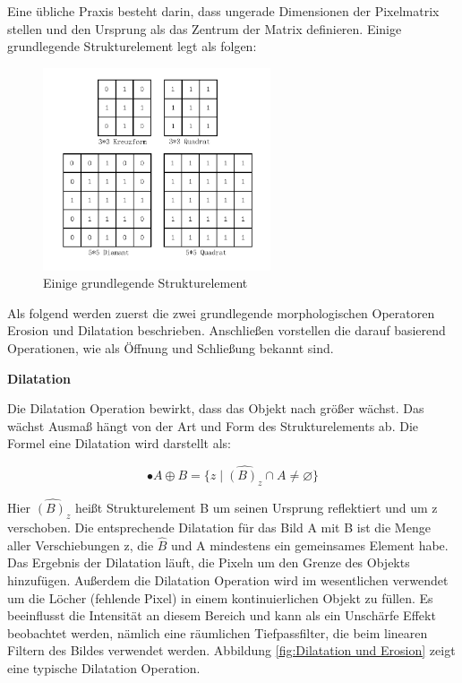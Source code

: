 Eine übliche Praxis besteht darin, dass ungerade Dimensionen der Pixelmatrix stellen und den Ursprung als das Zentrum der Matrix definieren. Einige grundlegende Strukturelement legt als folgen:

\begin{figure}[htb]
 \centering 
  \includegraphics[keepaspectratio,width=0.6\textwidth]{images/4_ZweiteErfahrung/Morphological/strelement.pdf}
 \caption{Einige grundlegende Strukturelement}
 \label{fig:Strukturelement}
\end{figure} 

Als folgend werden zuerst die zwei grundlegende morphologischen Operatoren Erosion und Dilatation beschrieben. Anschließen vorstellen die darauf basierend Operationen, wie als Öffnung und Schließung bekannt sind.

\textbf{Dilatation}

Die Dilatation Operation bewirkt, dass das Objekt nach größer wächst. Das wächst Ausmaß hängt von der Art und Form des Strukturelements ab. Die Formel eine Dilatation wird darstellt als:

\begin{equation}
•A \oplus B =\lbrace z \mid \widehat{(B)_z} \cap A \ne \varnothing \rbrace  
\end{equation}

Hier $ \widehat{(B)_z} $ heißt Strukturelement B um seinen Ursprung reflektiert und um z verschoben. Die entsprechende Dilatation für das Bild A mit B ist die Menge aller Verschiebungen z, die $ \widehat{B} $ und A mindestens ein gemeinsames Element habe. Das Ergebnis der Dilatation läuft, die Pixeln um den Grenze des Objekts hinzufügen. Außerdem die Dilatation Operation wird im wesentlichen verwendet um die Löcher (fehlende Pixel) in einem kontinuierlichen Objekt zu füllen. Es beeinflusst die Intensität an diesem Bereich und kann als ein Unschärfe Effekt beobachtet werden, nämlich eine räumlichen Tiefpassfilter, die beim linearen Filtern des Bildes verwendet werden. Abbildung \ref{fig:Dilatation und Erosion} zeigt eine typische Dilatation Operation.

